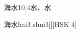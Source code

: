 \begin{entry}{海水}{10,4}{⽔、⽔}
  \begin{phonetics}{海水}{hai3 shui3}[][HSK 4]
  \end{phonetics}
\end{entry}
